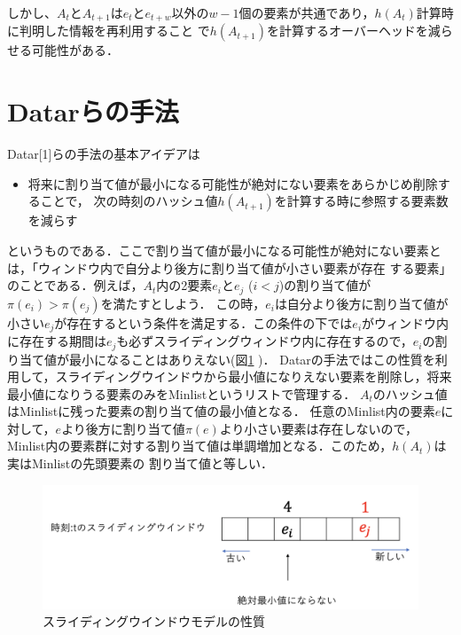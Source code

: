 しかし、$A_t$と$A_{t+1}$は$e_t$と$e_{t+w}$以外の$w-1$個の要素が共通であり，$h(A_t)$計算時に判明した情報を再利用すること
で$h(A_{t+1})$を計算するオーバーヘッドを減らせる可能性がある．

\section{Datarらの手法}
Datar[1]らの手法の基本アイデアは
\begin{itemize}
\item 将来に割り当て値が最小になる可能性が絶対にない要素をあらかじめ削除することで，
次の時刻のハッシュ値$h(A_{t+1})$を計算する時に参照する要素数を減らす
\end{itemize}
というものである．ここで割り当て値が最小になる可能性が絶対にない要素とは，「ウィンドウ内で自分より後方に割り当て値が小さい要素が存在
する要素」のことである．例えば，$A_{t}$内の2要素$e_i$と$e_j$ ($i<j$)の割り当て値が$\pi(e_i)>\pi(e_j)$を満たすとしよう．
この時，$e_i$は自分より後方に割り当て値が小さい$e_j$が存在するという条件を満足する．この条件の下では$e_i$がウィンドウ内に存在する期間は$e_j$も必ずスライディングウィンドウ内に存在するので，$e_i$の割り当て値が最小になることはありえない(図\ref{fig:datar_ML} )．
Datarの手法ではこの性質を利用して，スライディングウインドウから最小値になりえない要素を削除し，将来最小値になりうる要素のみをMinlistというリストで管理する．
$A_t$のハッシュ値はMinlistに残った要素の割り当て値の最小値となる．
任意のMinlist内の要素$e$に対して，$e$より後方に割り当て値$\pi(e)$より小さい要素は存在しないので，
Minlist内の要素群に対する割り当て値は単調増加となる．このため，$h(A_{t})$は実はMinlistの先頭要素の
割り当て値と等しい．

\begin{figure}[H]
 \centering
 \includegraphics[width=15cm]{datar_ML.png}
 \caption{スライディングウインドウモデルの性質}
 \label{fig:datar_ML}
\end{figure}

